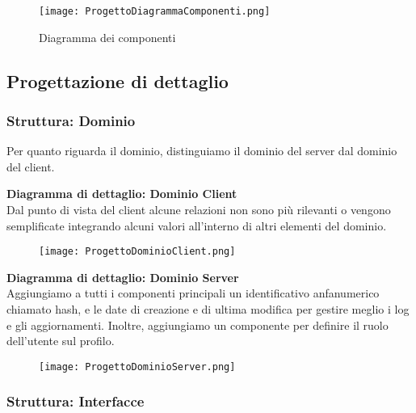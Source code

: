 \begin{figure}[h!]
    \begin{center}
        \texttt{[image: ProgettoDiagrammaComponenti.png]}
        \caption{Diagramma dei componenti}
    \end{center}
\end{figure}

\newpage

\subsection{Progettazione di dettaglio}

\subsubsection{Struttura: Dominio}

Per quanto riguarda il dominio, distinguiamo il dominio del server dal dominio del client.

\vspace{1em}

\textbf{Diagramma di dettaglio: Dominio Client}\\
Dal punto di vista del client alcune relazioni non sono più rilevanti o vengono semplificate integrando alcuni valori all'interno di altri elementi del dominio.
\begin{figure}[h!]
    \begin{center}
        \texttt{[image: ProgettoDominioClient.png]}
    \end{center}
\end{figure}
\clearpage
\textbf{Diagramma di dettaglio: Dominio Server}\\
Aggiungiamo a tutti i componenti principali un identificativo anfanumerico chiamato hash,
e le date di creazione e di ultima modifica per gestire meglio i log e gli aggiornamenti.
Inoltre, aggiungiamo un componente per definire il ruolo dell'utente sul profilo.
\begin{figure}[h!]
    \begin{center}
        \texttt{[image: ProgettoDominioServer.png]}
    \end{center}
\end{figure}
\newpage



\subsubsection{Struttura: Interfacce}

